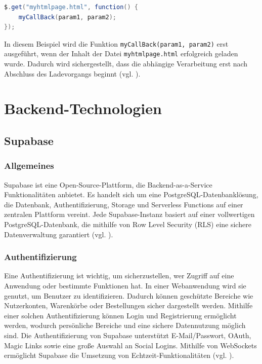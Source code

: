 \documentclass[oneside]{ausarbeitung}
\begin{document}
\begin{lstlisting}[language=Java, caption={Verwendung eines Callbacks in jQuery}]
$.get("myhtmlpage.html", function() { 
    myCallBack(param1, param2); 
});
\end{lstlisting}

In diesem Beispiel wird die Funktion \texttt{myCallBack(param1, param2)} erst ausgeführt, wenn der Inhalt der Datei \texttt{myhtmlpage.html} erfolgreich geladen wurde. Dadurch wird sichergestellt, dass die abhängige Verarbeitung erst nach Abschluss des Ladevorgangs beginnt (vgl. \parencite{jquery_api}).  

\section{Backend-Technologien}
\subsection{Supabase}
\subsubsection{Allgemeines}
Supabase ist eine Open-Source-Plattform, die Backend-as-a-Service Funktionalitäten anbietet. Es handelt sich um eine PostgreSQL-Datenbanklösung, die Datenbank, Authentifizierung, Storage und Serverless Functions auf einer zentralen Plattform vereint. Jede Supabase-Instanz basiert auf einer vollwertigen PostgreSQL-Datenbank, die mithilfe von Row Level Security (RLS) eine sichere Datenverwaltung garantiert (vgl. \parencite{supabase}).

\subsubsection{Authentifizierung}
Eine Authentifizierung ist wichtig, um sicherzustellen, wer Zugriff auf eine Anwendung oder bestimmte Funktionen hat. In einer Webanwendung wird sie genutzt, um Benutzer zu identifizieren. Dadurch können geschützte Bereiche wie Nutzerkonten, Warenkörbe oder Bestellungen sicher dargestellt werden. Mithilfe einer solchen Authentifizierung können Login und Registrierung ermöglicht werden, wodurch persönliche Bereiche und eine sichere Datennutzung möglich sind.
Die Authentifizierung von Supabase unterstützt E-Mail/Passwort, OAuth, Magic Links sowie eine große Auswahl an Social Logins. Mithilfe von WebSockets ermöglicht Supabase die Umsetzung von Echtzeit-Funktionalitäten (vgl. \parencite{supabase}).
\end{document}

